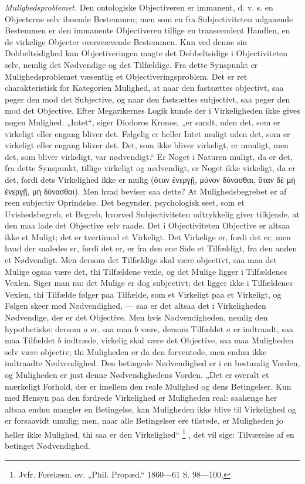 \documentclass[11pt]{book}
\newcommand{\opage}[1]{\marginnote{\footnotesize\textit{[#1]}}}
\begin{document}
\emph{Mulighedsproblemet.} Den ontologiske Objectiveren er
immanent, d. v. s. en Objecterne selv iboende Bestemmen; men som
en fra Subjectiviteten udgaaende Bestemmen er den immanente
Objectiveren tillige en transcendent Handlen, en de virkelige
Objecter oversvævende Bestemmen. Kun ved denne sin
Dobbeltsidighed kan Objectiveringen magte det Dobbeltsidige i
Objectiviteten selv, nemlig det Nødvendige og det Tilfældige. Fra
dette Synspunkt er Mulighedsproblemet væsentlig et
Objectiveringsproblem. Det er ret charakteristisk for Kategorien
Mulighed, at naar den fastsættes objectivt, saa peger den mod det
Subjective, og naar den fastsættes subjectivt, saa peger den mod
det Objective. Efter Megarikernes Logik kunde der i Virkeligheden
ikke gives nogen Mulighed. „Intet“, siger Diodoros Kronos, „er
sandt, uden det, som er virkeligt eller engang bliver det. Følgelig
er heller Intet muligt uden det, som er virkeligt eller engang
bliver det. Det, som ikke bliver virkeligt, er umuligt, men det,
som bliver virkeligt, var nødvendigt.“ Er Noget i Naturen muligt,
da er det, fra dette Synspunkt, tillige virkeligt og nødvendigt, er
Noget ikke virkeligt, da er det, fordi dets Virkelighed ikke er
mulig (ὅταν ἐνεργῇ, μόνον δύνασθαι, ὅταν δὲ μὴ ἐνεργῇ, μὴ
δύνασθαι). Men hvad beviser saa dette? At
\opage{176} \setcounter{footnote}{0}%
Mulighedsbegrebet er af reen subjectiv Oprindelse. Det begynder,
psychologisk seet, som et Uvishedsbegreb, et Begreb, hvorved
Subjectiviteten udtrykkelig giver tilkjende, at den maa lade det
Objective selv raade. Det i Objectiviteten Objective er altsaa ikke
et Muligt; det er tvertimod et Virkeligt. Det Virkelige er, fordi
det er; men hvad der saaledes er, fordi det er, er fra den ene Side
et Tilfældigt, fra den anden et Nødvendigt. Men dersom det
Tilfældige skal være objectivt, saa maa det Mulige ogsaa være det,
thi Tilfældene vexle, og det Mulige ligger i Tilfældenes Vexlen.
Siger man nu: det Mulige er dog subjectivt; det ligger ikke i
Tilfældenes Vexlen, thi Tilfælde følger paa Tilfælde, som et
Virkeligt paa et Virkeligt, og Følgen skeer med Nødvendighed, ---
saa er det altsaa det i Virkeligheden Nødvendige, der er det
Objective. Men hvis Nødvendigheden, nemlig den hypothetiske:
dersom $a$ er, saa maa $b$ være, dersom Tilfældet $a$ er
indtraadt, saa maa Tilfældet $b$ indtræde, virkelig skal være det
Objective, saa maa Muligheden selv være objectiv; thi Muligheden
er da den forventede, men endnu ikke indtraadte Nødvendighed. Den
betingede Nødvendighed er i en bestandig Vorden, og Muligheden er
just denne Nødvendighedens Vorden. „Det er overalt et mærkeligt
Forhold, der er imellem den reale Mulighed og dens Betingelser.
Kun med Hensyn paa den fordrede Virkelighed er Muligheden real:
saalænge her altsaa endnu mangler en Betingelse, kan Muligheden
ikke blive til Virkelighed og er forsaavidt umulig; men, naar alle
Betingelser ere tilstede, er Muligheden jo heller ikke Mulighed,
thi saa er den Virkelighed“%
\footnote{Jvfr. Forelæsn. ov. „Phil. Propæd.“ 1860---61 S. 98---100.}%
, det vil sige: Tilværelse af en betinget Nødvendighed.
\end{document}

